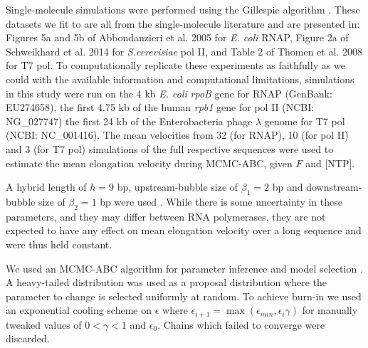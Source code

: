 \documentclass[10pt,letterpaper]{article}
\begin{document}
Single-molecule simulations were performed using the Gillespie algorithm \cite{gillespie1977exact}. These datasets we fit to are all from the single-molecule literature and are presented in: Figures 5a and 5b of Abbondanzieri et al. 2005 \cite{abbondanzieri2005direct} for {\it E. coli} RNAP, Figure 2a of Schweikhard et al. 2014 \cite{schweikhard2014transcription} for {\it S.cerevisiae} pol II, and Table 2 of Thomen et al. 2008 \cite{thomen2008t7} for T7 pol. To computationally replicate these experiments as faithfully as we could with the available information and computational limitations, simulations in this study were run on the 4 kb \textit{E. coli} \textit{rpoB} gene for RNAP (GenBank: EU274658), the first 4.75 kb of the human {\it rpb1} gene for pol II (NCBI: NG\_027747) the first 24 kb of the Enterobacteria phage $\lambda$ genome for T7 pol (NCBI: NC\_001416). The mean velocities from 32 (for RNAP), 10 (for pol II) and 3 (for T7 pol) simulations of the full respective sequences were used to estimate the mean elongation velocity during MCMC-ABC, given $F$ and [NTP].  \par


A hybrid length of $h = 9$ bp, upstream-bubble size of $\beta_1 = 2$ bp and downstream-bubble size of $\beta_2 = 1$ bp were used \cite{greive2005thinking, maoileidigh2011unified}. While there is some uncertainty in these parameters, and they may differ between RNA polymerases, they are not expected to have any effect on mean elongation velocity over a long sequence and were thus held constant. \par


We used an MCMC-ABC algorithm for parameter inference and model selection  \cite{beaumont2010approximate, csillery2010approximate}. A heavy-tailed distribution \cite{brewer2016dnest4} was used as a proposal distribution where the parameter to change is selected uniformly at random.
To achieve burn-in we used an exponential cooling scheme on $\epsilon$ \cite{ratmann2007using} where $\epsilon_{i+1} = \max(\epsilon_{min}, \epsilon_{i}\gamma)$ for manually tweaked values of $0 < \gamma < 1$ and $\epsilon_0$. Chains which failed to converge were discarded. \par 
\end{document}
